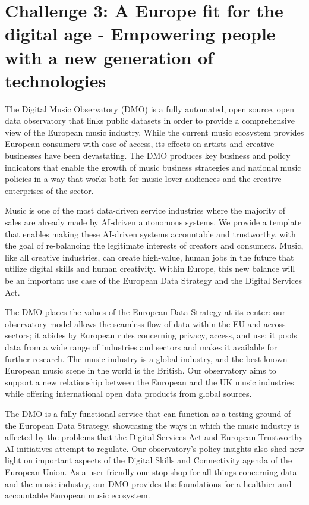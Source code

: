 \documentclass[
  a4paper,
  openany, a4paper, oneside]{book}
\begin{document}
\hypertarget{challenge-digital-age}{%
\section{Challenge 3: A Europe fit for the digital age - Empowering people with a new generation of technologies}\label{challenge-digital-age}}

The Digital Music Observatory (DMO) is a fully automated, open source, open data observatory that links public datasets in order to provide a comprehensive view of the European music industry. While the current music ecosystem provides European consumers with ease of access, its effects on artists and creative businesses have been devastating. The DMO produces key business and policy indicators that enable the growth of music business strategies and national music policies in a way that works both for music lover audiences and the creative enterprises of the sector.

Music is one of the most data-driven service industries where the majority of sales are already made by AI-driven autonomous systems. We provide a template that enables making these AI-driven systems accountable and trustworthy, with the goal of re-balancing the legitimate interests of creators and consumers. Music, like all creative industries, can create high-value, human jobs in the future that utilize digital skills and human creativity. Within Europe, this new balance will be an important use case of the European Data Strategy and the Digital Services Act.

The DMO places the values of the European Data Strategy at its center: our observatory model allows the seamless flow of data within the EU and across sectors; it abides by European rules concerning privacy, access, and use; it pools data from a wide range of industries and sectors and makes it available for further research. The music industry is a global industry, and the best known European music scene in the world is the British. Our observatory aims to support a new relationship between the European and the UK music industries while offering international open data products from global sources.

The DMO is a fully-functional service that can function as a testing ground of the European Data Strategy, showcasing the ways in which the music industry is affected by the problems that the Digital Services Act and European Trustworthy AI initiatives attempt to regulate. Our observatory's policy insights also shed new light on important aspects of the Digital Skills and Connectivity agenda of the European Union. As a user-friendly one-stop shop for all things concerning data and the music industry, our DMO provides the foundations for a healthier and accountable European music ecosystem.
\end{document}
